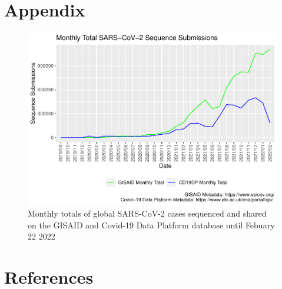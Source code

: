 \documentclass{article}
\begin{document}
\hypertarget{appendix}{%
\section{Appendix}\label{appendix}}

\begin{figure}
\centering
\includegraphics{Report_files/figure-latex/fig2-1.pdf}
\caption{Monthly totals of global SARS-CoV-2 cases sequenced and shared
on the GISAID and Covid-19 Data Platform database until Febuary 22 2022}
\end{figure}

\hypertarget{references}{%
\section*{References}\label{references}}
\end{document}
